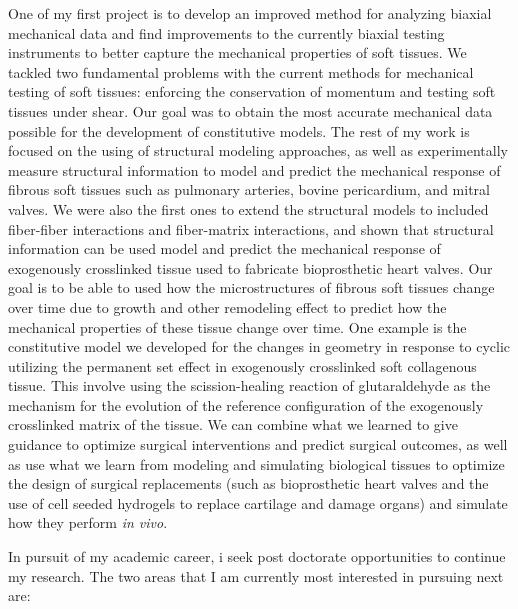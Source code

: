 \documentclass[11pt]{article}
\begin{document}
	One of my first project is to develop an improved method for analyzing biaxial mechanical data and find improvements to the currently biaxial testing instruments to better capture the mechanical properties of soft tissues. We tackled two fundamental problems with the current methods for mechanical testing of soft tissues: enforcing the conservation of momentum and testing soft tissues under shear. Our goal was to obtain the most accurate mechanical data possible for the development of constitutive models. The rest of my work is focused on the using of structural modeling approaches, as well as experimentally measure structural information to model and predict the mechanical response of fibrous soft tissues such as pulmonary arteries, bovine pericardium, and mitral valves. We were also the first ones to extend the structural models to included fiber-fiber interactions and fiber-matrix interactions, and shown that structural information can be used model and predict the mechanical response of exogenously crosslinked tissue used to fabricate bioprosthetic heart valves. Our goal is to be able to used how the microstructures of fibrous soft tissues change over time due to growth and other remodeling effect to predict how the mechanical properties of these tissue change over time. One example is the constitutive model we developed for the changes in geometry in response to cyclic utilizing the permanent set effect in exogenously crosslinked soft collagenous tissue. This involve using the scission-healing reaction of glutaraldehyde as the mechanism for the evolution of the reference configuration of the exogenously crosslinked matrix of the tissue. We can combine what we learned to give guidance to optimize surgical interventions and predict surgical outcomes, as well as use what we learn from modeling and simulating biological tissues to optimize the design of surgical replacements (such as bioprosthetic heart valves and the use of cell seeded hydrogels to replace cartilage and damage organs) and simulate how they perform \textit{in vivo}. 
	
	In pursuit of my academic career, i seek post doctorate opportunities to continue my research. The two areas that I am currently most interested in pursuing next are:
\end{document}
